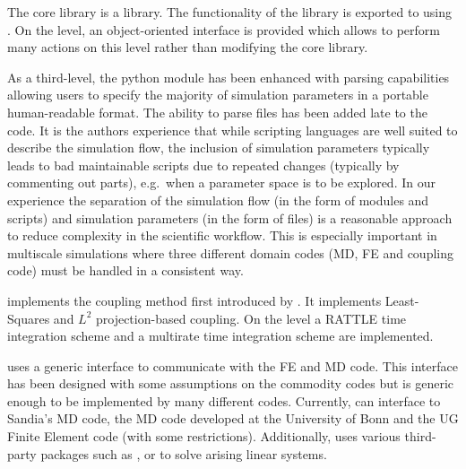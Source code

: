 
The core \MACI library is a \CPP library. The functionality of the library is exported to \PYTHON using \SWIG. On the \PYTHON level, an object-oriented interface is provided which allows to perform many actions on this level rather than modifying the core library. 

As a third-level, the python module has been enhanced with \XML parsing capabilities allowing users to specify the majority of simulation parameters in a portable human-readable format. The ability to parse \XML files has been added late to the code. It is the authors experience that while scripting languages are well suited to describe the simulation flow, the inclusion of simulation parameters typically leads to bad maintainable scripts due to repeated changes (typically by commenting out parts), e.g.~when a parameter space is to be explored. In our experience the separation of the simulation flow (in the form of \PYTHON modules and scripts) and simulation parameters (in the form of \XML files) is a reasonable approach to reduce complexity in the scientific workflow. This is especially important in multiscale simulations where three different domain codes (MD, FE and coupling code) must be handled in a consistent way.

\MACI implements the coupling method first introduced by \citet{FackeldeyKrauseKrauseLenzen2011}. It implements Least-Squares and $L^2$ projection-based coupling. On the \PYTHON level a RATTLE time integration scheme and a multirate time integration scheme are implemented. 

\MACI uses a generic interface to communicate with the FE and MD code. This interface has been designed with some assumptions on the commodity codes but is generic enough to be implemented by many different codes. Currently, \MACI can interface to Sandia's \LAMMPS MD code, the \TREMOLO MD code developed at the University of Bonn and the UG Finite Element code (with some restrictions). Additionally, \MACI uses various third-party packages such as \TRILINOS, \PETSC or \UMFPACK to solve arising linear systems. 
